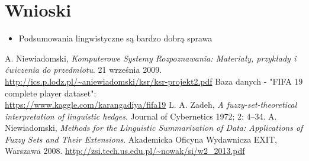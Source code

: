 \documentclass{classrep}
\begin{document}
\section{Wnioski}
\begin{itemize}
\item Podsumowania lingwistyczne są bardzo dobrą sprawa
\end{itemize}

\begin{thebibliography}{}
    A. Niewiadomski,
    \emph{Komputerowe Systemy Rozpoznawania: Materiały, przykłady i ćwiczenia do przedmiotu}.
    21 września 2009.
    \url{http://ics.p.lodz.pl/~aniewiadomski/ksr/ksr-projekt2.pdf}
    Baza danych - "FIFA 19 complete player dataset":\\
    \url{https://www.kaggle.com/karangadiya/fifa19}    
    L. A. Zadeh,
    \emph{A fuzzy-set-theoretical interpretation of linguistic hedges}.
    Journal of Cybernetics 1972; 2: 4–34.
    A. Niewiadomski,
    \emph{Methods for the Linguistic Summarization of Data: Applications of Fuzzy Sets and Their Extensions}.
    Akademicka Oficyna Wydawnicza EXIT,
    Warszawa 2008.
    \url{http://zsi.tech.us.edu.pl/~nowak/si/w2_2013.pdf}
\end{thebibliography}
\end{document}
